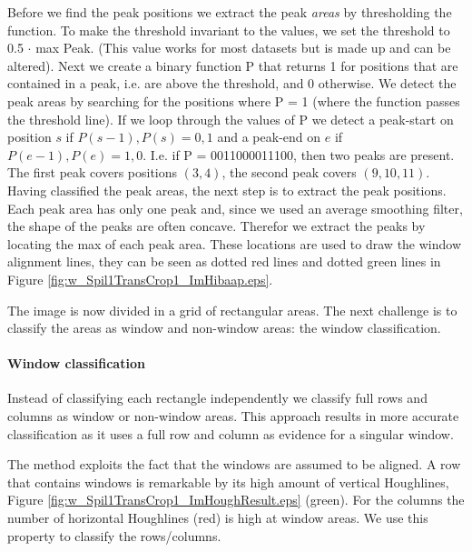 Before we find the peak positions we extract the peak \emph{areas} by thresholding the
function. To make the threshold invariant to the values, we set the threshold to 0.5 $\cdot$ max Peak. 
(This value works for most datasets but is made up and can be altered).
Next we create a binary function P that returns 1 for positions that are contained in
a peak, i.e. are above the threshold, and 0 otherwise.
We detect the peak areas by searching for the positions where P = 1
(where the function passes the threshold line). 
If we loop through the values of P we detect a peak-start on position $s$ if ${P(s-1),P(s)}={0,1}$
and a peak-end on $e$ if ${P(e-1),P(e)}={1,0}$. 
I.e. if P = 0011000011100, then two peaks are present. The first peak covers positions $(3,4)$, 
the second peak covers $(9,10,11)$.\\

Having classified the peak areas, the next step is to extract the peak positions. 
Each peak area has only one peak and, since we used an average smoothing filter, the shape of 
the peaks are often concave. Therefor we extract the peaks by locating the max of each peak area. 
These locations are used to draw the window alignment lines, they can be seen
as dotted red lines and dotted green lines in Figure \ref{fig:w_Spil1TransCrop1_ImHibaap.eps}.

The image is now divided in a grid of rectangular areas. The next challenge is to 
classify the areas as window and non-window areas: the window classification.

\paragraph{Window classification}
Instead of classifying each rectangle independently we classify full rows and
columns as window or non-window areas.  This approach results in more accurate
classification as it uses a full row and column as evidence for a singular
window. 

The method exploits the fact that the windows are assumed to be
aligned.
A row that contains windows is remarkable by its high amount of vertical
Houghlines, Figure \ref{fig:w_Spil1TransCrop1_ImHoughResult.eps}
(green). For the columns the number of horizontal Houghlines
 (red) is high at window areas.  We use this property to classify 
 the rows/columns. 

